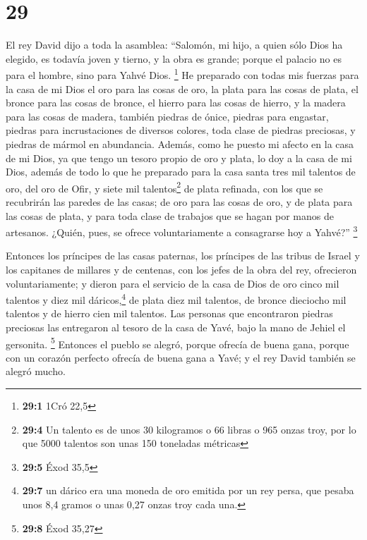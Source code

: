 \hypertarget{section-28}{%
\section{29}\label{section-28}}

 El rey David dijo a toda la asamblea: ``Salomón, mi hijo,
a quien sólo Dios ha elegido, es todavía joven y tierno, y la obra es
grande; porque el palacio no es para el hombre, sino para Yahvé Dios.
\footnote{\textbf{29:1} 1Cró 22,5}  He preparado con todas
mis fuerzas para la casa de mi Dios el oro para las cosas de oro, la
plata para las cosas de plata, el bronce para las cosas de bronce, el
hierro para las cosas de hierro, y la madera para las cosas de madera,
también piedras de ónice, piedras para engastar, piedras para
incrustaciones de diversos colores, toda clase de piedras preciosas, y
piedras de mármol en abundancia.  Además, como he puesto
mi afecto en la casa de mi Dios, ya que tengo un tesoro propio de oro y
plata, lo doy a la casa de mi Dios, además de todo lo que he preparado
para la casa santa  tres mil talentos de oro, del oro de
Ofir, y siete mil talentos\footnote{\textbf{29:4} Un talento es de unos
  30 kilogramos o 66 libras o 965 onzas troy, por lo que 5000 talentos
  son unas 150 toneladas métricas} de plata refinada, con los que se
recubrirán las paredes de las casas;  de oro para las
cosas de oro, y de plata para las cosas de plata, y para toda clase de
trabajos que se hagan por manos de artesanos. ¿Quién, pues, se ofrece
voluntariamente a consagrarse hoy a Yahvé?'' \footnote{\textbf{29:5}
  Éxod 35,5}

 Entonces los príncipes de las casas paternas, los
príncipes de las tribus de Israel y los capitanes de millares y de
centenas, con los jefes de la obra del rey, ofrecieron voluntariamente;
 y dieron para el servicio de la casa de Dios de oro cinco
mil talentos y diez mil dáricos,\footnote{\textbf{29:7} un dárico era
  una moneda de oro emitida por un rey persa, que pesaba unos 8,4 gramos
  o unas 0,27 onzas troy cada una.} de plata diez mil talentos, de
bronce dieciocho mil talentos y de hierro cien mil talentos.
 Las personas que encontraron piedras preciosas las
entregaron al tesoro de la casa de Yavé, bajo la mano de Jehiel el
gersonita. \footnote{\textbf{29:8} Éxod 35,27}  Entonces
el pueblo se alegró, porque ofrecía de buena gana, porque con un corazón
perfecto ofrecía de buena gana a Yavé; y el rey David también se alegró
mucho.

